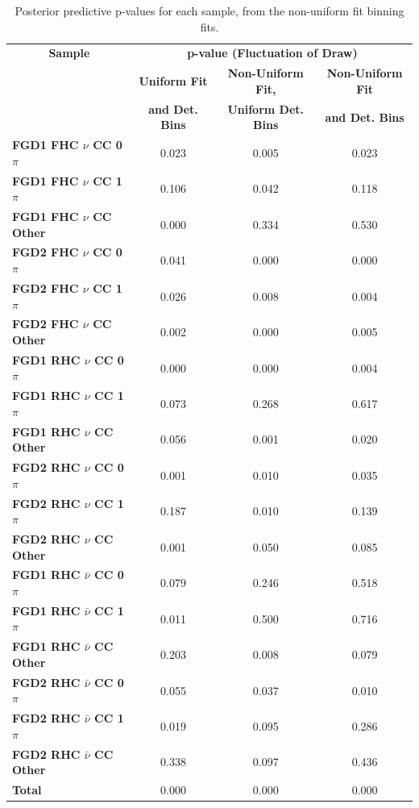 \begin{center}
\begin{table}
\center
\begin{tabular}{l||c c c}
\hline \hline
\multicolumn{1}{c||}{\textbf{Sample}} & \multicolumn{3}{c}{\textbf{p-value (Fluctuation of Draw)}} \\
& \multicolumn{1}{c}{\textbf{Uniform Fit}} & \multicolumn{1}{c}{\textbf{Non-Uniform Fit,}} & \multicolumn{1}{c}{\textbf{Non-Uniform Fit}}\\
& \multicolumn{1}{c}{\textbf{and Det. Bins}} & \multicolumn{1}{c}{\textbf{Uniform Det. Bins}} & \multicolumn{1}{c}{\textbf{and Det. Bins}}\\
\hline \hline
\textbf{FGD1 FHC $\nu$ CC 0$\pi$} & 0.023 & 0.005 & 0.023 \\ 
\textbf{FGD1 FHC $\nu$ CC 1$\pi$} & 0.106 & 0.042 & 0.118 \\
\textbf{FGD1 FHC $\nu$ CC Other} & 0.000 & 0.334 & 0.530 \\ \hline
\textbf{FGD2 FHC $\nu$ CC 0$\pi$} & 0.041 & 0.000 & 0.000 \\
\textbf{FGD2 FHC $\nu$ CC 1$\pi$} & 0.026 & 0.008 & 0.004\\ 
\textbf{FGD2 FHC $\nu$ CC Other} & 0.002 & 0.000 & 0.005\\ \hline
\textbf{FGD1 RHC $\nu$ CC 0$\pi$} & 0.000 & 0.000 & 0.004\\
\textbf{FGD1 RHC $\nu$ CC 1$\pi$} & 0.073 & 0.268 & 0.617 \\
\textbf{FGD1 RHC $\nu$ CC Other} & 0.056 & 0.001 & 0.020 \\ \hline
\textbf{FGD2 RHC $\nu$ CC 0$\pi$} & 0.001 & 0.010 & 0.035 \\
\textbf{FGD2 RHC $\nu$ CC 1$\pi$} & 0.187 & 0.010 & 0.139\\
\textbf{FGD2 RHC $\nu$ CC Other} & 0.001 & 0.050 & 0.085 \\ \hline
\textbf{FGD1 RHC $\bar{\nu}$ CC 0$\pi$} & 0.079 & 0.246 & 0.518 \\
\textbf{FGD1 RHC $\bar{\nu}$ CC 1$\pi$} & 0.011 & 0.500 & 0.716\\
\textbf{FGD1 RHC $\bar{\nu}$ CC Other} & 0.203 & 0.008 & 0.079\\ \hline
\textbf{FGD2 RHC $\bar{\nu}$ CC 0$\pi$} & 0.055 & 0.037 & 0.010\\
\textbf{FGD2 RHC $\bar{\nu}$ CC 1$\pi$} & 0.019 & 0.095 & 0.286\\
\textbf{FGD2 RHC $\bar{\nu}$ CC Other} & 0.338 & 0.097 & 0.436\\ \hline
\textbf{Total} & 0.000 & 0.000 & 0.000 \\ \hline\hline
\end{tabular}
\caption{Posterior predictive p-values for each sample, from the non-uniform fit binning fits.}
\label{tab:polypval}
\end{table}
\end{center}

